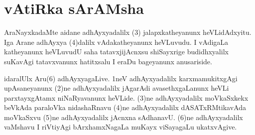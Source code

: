 \chapter{vAtiRka sArAMsha}


\begin{artha}
AraNayxkadaMte aidane adhAyxyadalilx (3) jalapxkatheyanunx heVLi\-\break dAdxyitu. Iga Arane adhAyxya (4)dalilx vAdakatheyanunx heVLuvudu. I vAdigaLa katheyanunx heVLuvudU saha tatavxjijAcnxsu shiSayxrige budidhxyalilx suKavAgi tatavxvanunx hatitxsalu I eraDu bageyanunx anusariside.
\end{artha}


\begin{artha}
idaralUlx Aru(6) adhAyxyagaLive. 1neV adhAyxyadalilx karxma\-mukitxgAgi upAsaneyanunx (2)ne adhAyxyadalilx jAgarAdi avasethxgaLanunx heVLi parxtayxgAtamx niNaRyavanunx heVLide. (3)ne adhAyxyadalilx moVkaSxkekx beVkAda paraloVka nidashaRnavu (4)ne adhAyxyadalilx dASATxRMtikavAda moVkaSxvu (5)ne adhAyxyadalilx jAcnxna sAdhanavU. (6)ne adhAyxyadalilx vaMshavu I riVtiyAgi bArxhamxNagaLa muKayx viSayagaLu ukatxvAgive.
\end{artha}


